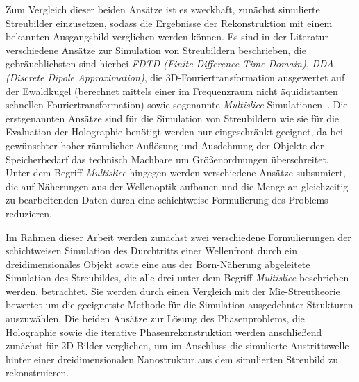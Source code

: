 Zum Vergleich dieser beiden Ansätze ist es zweckhaft, zunächst simulierte Streubilder einzusetzen, sodass die Ergebnisse der Rekonstruktion mit einem bekannten Ausgangsbild verglichen werden können. Es sind in der Literatur verschiedene Ansätze zur Simulation von Streubildern beschrieben, die gebräuchlichsten sind hierbei \textit{FDTD (Finite Difference Time Domain)}, \textit{DDA (Discrete Dipole Approximation)}, die 3D-Fouriertransformation ausgewertet auf der Ewaldkugel (berechnet mittels einer im Frequenzraum nicht äquidistanten schnellen Fouriertransformation) sowie sogenannte \textit{Multislice} Simulationen~\cite{drezek1999,sander2014,hantke2016,hare1994,barke2015}. Die erstgenannten Ansätze sind für die Simulation von Streubildern wie sie für die Evaluation der Holographie benötigt werden nur eingeschränkt geeignet, da bei gewünschter hoher räumlicher Auflösung und Ausdehnung der Objekte der Speicherbedarf das technisch Machbare um Größenordnungen überschreitet. Unter dem Begriff \textit{Multislice} hingegen werden verschiedene Ansätze subsumiert, die auf Näherungen aus der Wellenoptik aufbauen und die Menge an gleichzeitig zu bearbeitenden Daten durch eine schichtweise Formulierung des Problems reduzieren. 

Im Rahmen dieser Arbeit werden zunächst zwei verschiedene Formulierungen der schichtweisen Simulation des Durchtritts einer Wellenfront durch ein dreidimensionales Objekt sowie eine aus der Born-Näherung abgeleitete Simulation des Streubildes, die alle drei unter dem Begriff \textit{Multislice} beschrieben werden, betrachtet. Sie werden durch einen Vergleich mit der Mie-Streutheorie bewertet um die geeignetste Methode für die Simulation ausgedehnter Strukturen auszuwählen. Die beiden Ansätze zur Lösung des Phasenproblems, die Holographie sowie die iterative Phasenrekonstruktion werden anschließend zunächst für 2D Bilder verglichen, um im Anschluss die simulierte Austrittswelle hinter einer dreidimensionalen Nanostruktur aus dem simulierten Streubild zu rekonstruieren.

